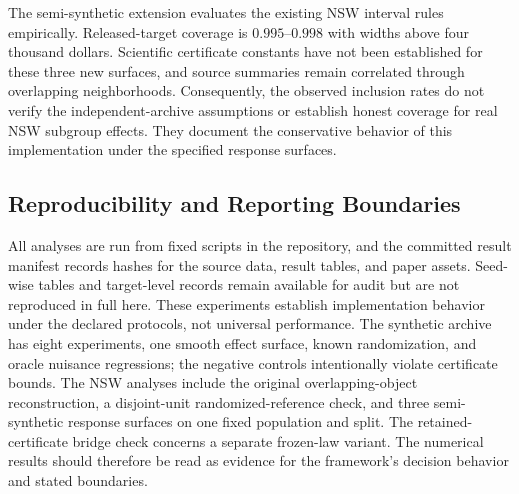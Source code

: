 \documentclass[11pt]{article}
\numberwithin{equation}{section}
\newcommand{\1}{\mathbf 1}
\begin{document}
The semi-synthetic extension evaluates the existing NSW interval rules empirically. Released-target coverage is $0.995$--$0.998$ with widths above four thousand dollars. Scientific certificate constants have not been established for these three new surfaces, and source summaries remain correlated through overlapping neighborhoods. Consequently, the observed inclusion rates do not verify the independent-archive assumptions or establish honest coverage for real NSW subgroup effects. They document the conservative behavior of this implementation under the specified response surfaces.

\subsection*{Reproducibility and Reporting Boundaries}
All analyses are run from fixed scripts in the repository, and the committed result manifest records hashes for the source data, result tables, and paper assets.  Seed-wise tables and target-level records remain available for audit but are not reproduced in full here.  These experiments establish implementation behavior under the declared protocols, not universal performance.  The synthetic archive has eight experiments, one smooth effect surface, known randomization, and oracle nuisance regressions; the negative controls intentionally violate certificate bounds.  The NSW analyses include the original overlapping-object reconstruction, a disjoint-unit randomized-reference check, and three semi-synthetic response surfaces on one fixed population and split. The retained-certificate bridge check concerns a separate frozen-law variant.  The numerical results should therefore be read as evidence for the framework's decision behavior and stated boundaries.
\end{document}

